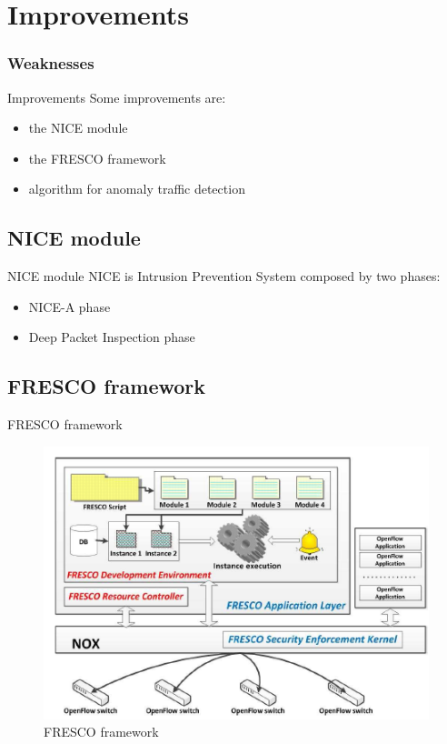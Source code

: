 \section{Improvements}
\frame
{
\frametitle{Weaknesses}
\tableofcontents[currentsection]
\addtocounter{framenumber}{-1}
}

\begin{frame}{Improvements}
Some improvements are:
\begin{itemize}
\item<2-> the NICE module
\item<3-> the FRESCO framework
\item<4-> algorithm for anomaly traffic detection
\end{itemize}
\end{frame}

\subsection*{NICE module}
\begin{frame}{NICE module}
NICE is Intrusion Prevention System composed by two phases:
\begin{itemize}
\item<2-> NICE-A phase
\item<3-> Deep Packet Inspection phase
\end{itemize}
\end{frame}

\subsection*{FRESCO framework}
\begin{frame}{FRESCO framework}
\begin{figure}
\includegraphics[scale=0.55]{Immagini/FrescoStructure.png}
\caption{FRESCO framework}
\label{fig:FRESCO-framework}
\end{figure}
\end{frame}

